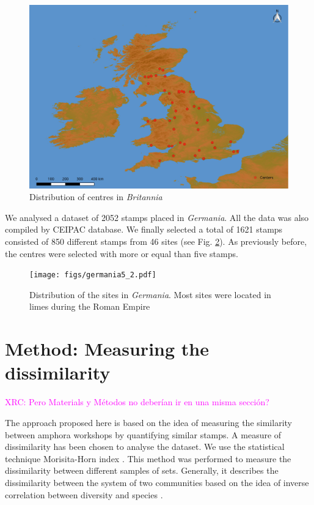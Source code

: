\documentclass[review]{elsarticle}
\newcommand{\memo}[2]{\textcolor{#1}{#2}}
\newcommand{\xavi}[1]{\memo{magenta}{XRC: #1\\}}
\begin{document}
\begin{figure}[htp]
	\centering
\includegraphics[width=\linewidth]{figs/britmap2.pdf}
\caption{Distribution of centres in \textit{Britannia}}
\label{britannia}
\end{figure} 


We analysed a dataset of 2052 stamps placed in \textit{Germania}. All the data was also compiled by CEIPAC database. We finally selected a total of 1621 stamps consisted of 850 different stamps from 46 sites (see Fig. \ref{germania}). As previously before, the centres were selected with more or equal than five stamps. 


\begin{figure}[htp]
	\centering
\texttt{[image: figs/germania5\_2.pdf]}
\caption{Distribution of the sites in \textit{Germania}. Most sites were located in limes during the Roman Empire}
\label{germania}
\end{figure}


\section{Method: Measuring the dissimilarity}

\xavi{Pero Materials y Métodos no deberían ir en una misma sección?}


The approach proposed here is based on the idea of measuring the similarity between amphora workshops by quantifying similar stamps. A measure of dissimilarity has been chosen to analyse the dataset. We use the statistical technique Morisita-Horn index \citep{morisita_measuring_1959, horn_measurement_1966}. This method was performed to measure the dissimilarity between different samples of sets. Generally, it describes the dissimilarity between the system of two communities based on the idea of inverse correlation between diversity and species \citep{magurran_why_1988}.
\end{document}
